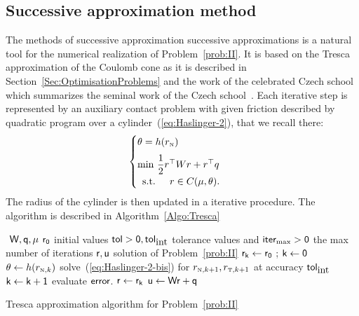 \subsection{Successive approximation  method}
\label{Sec:Tresca-solver}
The methods of successive approximation successive approximations is a natural tool for the numerical realization of Problem~\ref{prob:II}. It is based on the Tresca approximation of the Coulomb cone as it is described in Section~\ref{Sec:OptimisationProblems} and the work of the celebrated Czech school which summarizes the seminal work of the Czech school~\cite{Necas.ea1980,Haslinger1983,Haslinger1984,Haslinger.ea1996}.   Each iterative step is represented by an auxiliary contact problem with given friction described by quadratic program over a cylinder~(\ref{eq:Haslinger-2}), that we recall there:
\begin{equation}
  \label{eq:Haslinger-2-bis}
  \begin{cases}
    \theta = h(r_\n) \\[2mm]
    \min\, \Frac 1 2 r^\top W r + r^\top q \\
    \begin{array}{ll}
    \text{s.t. }& r \in C(\mu,\theta).
  \end{array}
  \end{cases}
\end{equation}
The radius of the cylinder is then updated in a iterative procedure.  The algorithm is described in Algorithm~\ref{Algo:Tresca}
\begin{algorithm}
  \begin{algorithmic}
    {\sf
      \STATE $ $ 
      \REQUIRE $\sf W,q,\mu$
      \REQUIRE $\sf r_0$ initial values
      \REQUIRE $\sf tol >0, tol_{\mbox{int}}$  tolerance values and $\sf iter_{\max}  >0$ the max number of iterations
      \ENSURE  $\sf r,u$ solution of Problem~\ref{prob:II}
      \STATE $\sf r_{k} \leftarrow r_0 $ ; $\sf k \leftarrow 0$ 
      \STATE $\theta \leftarrow h(r_{{\hbox{\tiny{N}}},k})$ 
      \STATE solve~(\ref{eq:Haslinger-2-bis}) for $r_{{\hbox{\tiny{N}}},k+1},r_{{\hbox{\tiny{T}}},k+1}$ at accuracy $\sf tol_{\mbox{int}}$
      \STATE $\sf k \leftarrow k+1$
      \STATE evaluate $\sf error$.
      \ENDWHILE
      \STATE $\sf r \leftarrow r_{k}$ 
      \STATE $\sf u \leftarrow W r + q$ 
    }
  \end{algorithmic}
  \caption{Tresca approximation algorithm for Problem~\ref{prob:II}}
  \label{Algo:Tresca}
\end{algorithm}


